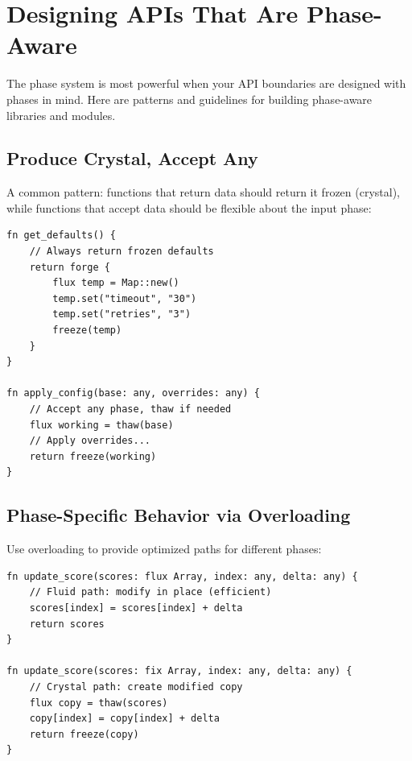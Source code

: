 
\section{Designing APIs That Are Phase-Aware}\label{sec:phase-aware-apis}


The phase system is most powerful when your API boundaries are designed with phases in mind.
Here are patterns and guidelines for building phase-aware libraries and modules.

\subsection{Produce Crystal, Accept Any}

A common pattern: functions that return data should return it frozen (crystal), while functions that accept data should be flexible about the input phase:

\begin{lstlisting}[language=Lattice, caption={Produce crystal, accept any}]
fn get_defaults() {
    // Always return frozen defaults
    return forge {
        flux temp = Map::new()
        temp.set("timeout", "30")
        temp.set("retries", "3")
        freeze(temp)
    }
}

fn apply_config(base: any, overrides: any) {
    // Accept any phase, thaw if needed
    flux working = thaw(base)
    // Apply overrides...
    return freeze(working)
}
\end{lstlisting}

\subsection{Phase-Specific Behavior via Overloading}

Use overloading to provide optimized paths for different phases:

\begin{lstlisting}[language=Lattice, caption={Optimized paths via phase overloading}]
fn update_score(scores: flux Array, index: any, delta: any) {
    // Fluid path: modify in place (efficient)
    scores[index] = scores[index] + delta
    return scores
}

fn update_score(scores: fix Array, index: any, delta: any) {
    // Crystal path: create modified copy
    flux copy = thaw(scores)
    copy[index] = copy[index] + delta
    return freeze(copy)
}
\end{lstlisting}


